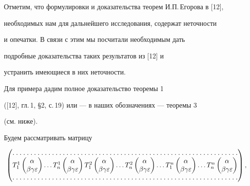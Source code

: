 Отметим, что формулировки и доказательства теорем И.П.\,Егорова в [12],


необходимых нам для дальнейшего исследования, содержат неточности


и опечатки. В связи с этим мы посчитали необходимым дать 


подробные доказательства таких результатов из [12] и


устранить имеющиеся в них неточности.





Для примера дадим полное доказательство теоремы 1 


([12], гл.\,1, \S 2, с.\,19) или --- в наших обозначениях --- теоремы 3


(см. ниже).





Будем рассматривать матрицу


\begin{equation}


\begin{pmatrix}


\hdotsfor[1.5]{1}\\


T^{1 }_{1 }


\begin{pmatrix}\alpha\\ \beta \gamma \varepsilon\end{pmatrix}\dotsc


T^{1 }_{n}


\begin{pmatrix}\alpha\\ \beta \gamma \varepsilon\end{pmatrix}


T^{2}_{1} \begin{pmatrix}\alpha\\


\beta \gamma \varepsilon\end{pmatrix}\dotsc


T^{2}_{n} \begin{pmatrix}\alpha\\


\beta \gamma \varepsilon\end{pmatrix}\dotsc


T^{n}_{1} \begin{pmatrix}\alpha\\


\beta \gamma \varepsilon\end{pmatrix}\dotsc T^{n}_{n}


\begin{pmatrix}\alpha\\


\beta \gamma \varepsilon\end{pmatrix}\\


\hdotsfor[1.5]{1}


\end{pmatrix}


,


\end{equation}


